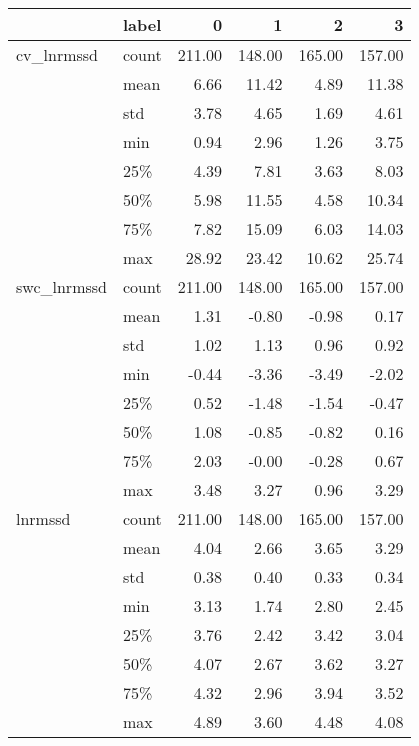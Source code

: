 \begin{tabular}{llrrrr}
\toprule
            & label &       0 &       1 &       2 &       3 \\
\midrule
cv\_lnrmssd & count &  211.00 &  148.00 &  165.00 &  157.00 \\
            & mean &    6.66 &   11.42 &    4.89 &   11.38 \\
            & std &    3.78 &    4.65 &    1.69 &    4.61 \\
            & min &    0.94 &    2.96 &    1.26 &    3.75 \\
            & 25\% &    4.39 &    7.81 &    3.63 &    8.03 \\
            & 50\% &    5.98 &   11.55 &    4.58 &   10.34 \\
            & 75\% &    7.82 &   15.09 &    6.03 &   14.03 \\
            & max &   28.92 &   23.42 &   10.62 &   25.74 \\
swc\_lnrmssd & count &  211.00 &  148.00 &  165.00 &  157.00 \\
            & mean &    1.31 &   -0.80 &   -0.98 &    0.17 \\
            & std &    1.02 &    1.13 &    0.96 &    0.92 \\
            & min &   -0.44 &   -3.36 &   -3.49 &   -2.02 \\
            & 25\% &    0.52 &   -1.48 &   -1.54 &   -0.47 \\
            & 50\% &    1.08 &   -0.85 &   -0.82 &    0.16 \\
            & 75\% &    2.03 &   -0.00 &   -0.28 &    0.67 \\
            & max &    3.48 &    3.27 &    0.96 &    3.29 \\
lnrmssd & count &  211.00 &  148.00 &  165.00 &  157.00 \\
            & mean &    4.04 &    2.66 &    3.65 &    3.29 \\
            & std &    0.38 &    0.40 &    0.33 &    0.34 \\
            & min &    3.13 &    1.74 &    2.80 &    2.45 \\
            & 25\% &    3.76 &    2.42 &    3.42 &    3.04 \\
            & 50\% &    4.07 &    2.67 &    3.62 &    3.27 \\
            & 75\% &    4.32 &    2.96 &    3.94 &    3.52 \\
            & max &    4.89 &    3.60 &    4.48 &    4.08 \\

\end{tabular}
